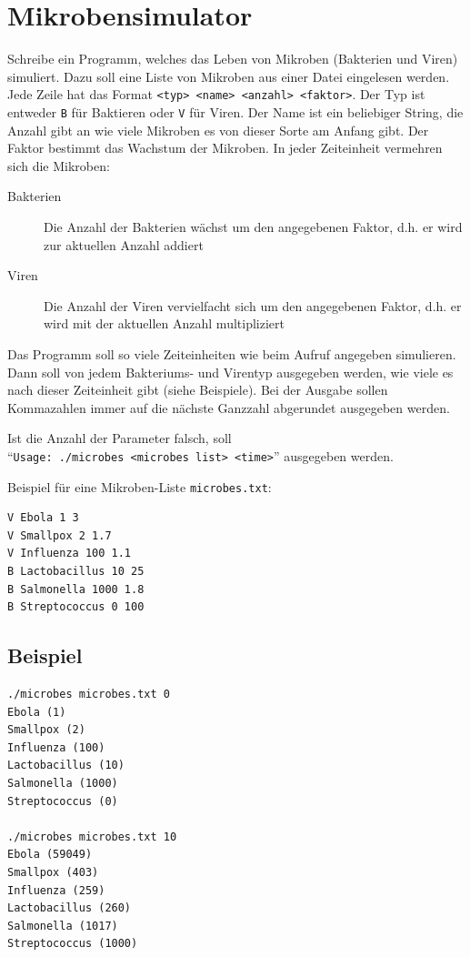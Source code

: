 \documentclass[a4paper,10pt]{article}
\begin{document}
\section*{Mikrobensimulator}

Schreibe ein Programm, welches das Leben von Mikroben (Bakterien und Viren) simuliert. Dazu soll eine Liste von Mikroben aus einer Datei eingelesen werden. Jede Zeile hat das Format \texttt{<typ> <name> <anzahl> <faktor>}. Der Typ ist entweder \texttt{B} für Baktieren oder \texttt{V} für Viren. Der Name ist ein beliebiger String, die Anzahl gibt an wie viele Mikroben es von dieser Sorte am Anfang gibt. Der Faktor bestimmt das Wachstum der Mikroben. In jeder Zeiteinheit vermehren sich die Mikroben:
\begin{description}
 \item[Bakterien] Die Anzahl der Bakterien wächst um den angegebenen Faktor, d.h. er wird zur aktuellen Anzahl addiert
 \item[Viren] Die Anzahl der Viren vervielfacht sich um den angegebenen Faktor, d.h. er wird mit der aktuellen Anzahl multipliziert
\end{description}

Das Programm soll so viele Zeiteinheiten wie beim Aufruf angegeben simulieren. Dann soll von jedem Bakteriums- und Virentyp ausgegeben werden, wie viele es nach dieser Zeiteinheit gibt (siehe Beispiele). Bei der Ausgabe sollen Kommazahlen immer auf die nächste Ganzzahl abgerundet ausgegeben werden.

Ist die Anzahl der Parameter falsch, soll \\
``\texttt{Usage: ./microbes <microbes~list> <time>}'' ausgegeben werden.

\vspace{1em}

Beispiel für eine Mikroben-Liste \texttt{microbes.txt}:
\begin{lstlisting}[frame=single]
V Ebola 1 3
V Smallpox 2 1.7
V Influenza 100 1.1
B Lactobacillus 10 25
B Salmonella 1000 1.8
B Streptococcus 0 100
\end{lstlisting}

\subsection*{Beispiel}
\footnotesize
\begin{verbatim}
./microbes microbes.txt 0
Ebola (1)
Smallpox (2)
Influenza (100)
Lactobacillus (10)
Salmonella (1000)
Streptococcus (0)

./microbes microbes.txt 10
Ebola (59049)
Smallpox (403)
Influenza (259)
Lactobacillus (260)
Salmonella (1017)
Streptococcus (1000)
\end{verbatim}
\end{document}
